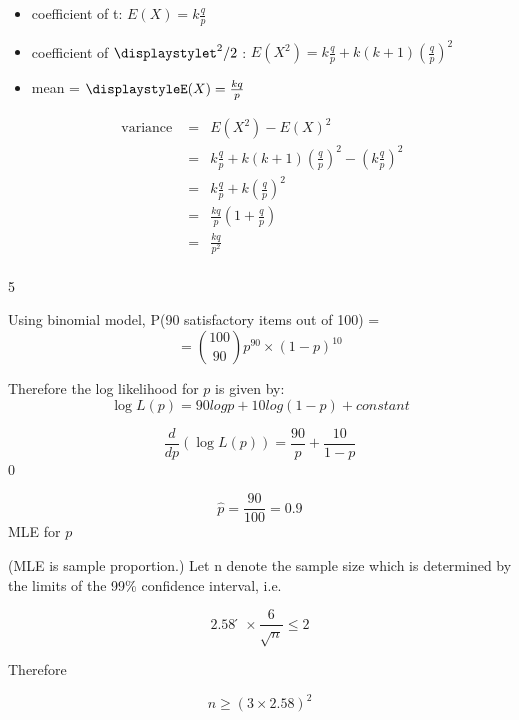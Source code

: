 \documentclass[a4paper,12pt]{article}
\begin{document}
\begin{enumerate}
\begin{itemize}
\begin{framed}
\end{framed}

\begin{itemize}
\item coefficient of t: ${ \displaystyle E ( X ) = k\frac{q}{p} }$
\item coefficient of ${ \displaystylet^2/2  }$
: ${ \displaystyle E (X^2 ) = k \frac{q}{p}+ k ( k + 1)(\frac{q}{p} )^2 }$
\item mean = ${ \displaystyleE ( X ) = \frac{kq}{p}}$
\end{itemize}

\begin{eqnarray*}
\mbox{ variance }&=& E ( X^2 ) - E( X )^2 \\ 
&=& k\frac{q}{p} + k ( k + 1)(\frac{q}{p} )^2 - \left( k\frac{q}{p} \right)^2\\
&=& k\frac{q}{p} + k \left( \frac{q}{p} \right)^2 \\
&=& \frac{kq}{p} \left( 1 + \frac{q}{p} \right) \\
&=& \frac{kq}{p^2} \\
\end{eqnarray*}


5 

Using binomial model, P(90 satisfactory items out of 100) = 
\[ = {100 \choose 90} p^90 \times (1-p)^{10}\]

Therefore the log likelihood for $p$ is given by:
\[ \log L ( p ) = 90 log p + 10 log(1 - p ) + constant\]


\[ \frac{d}{dp} \left(\log L ( p ) \right) = \frac{90}{p} + \frac{ 10 }{1 - p }\]0

\[ \hat{p}= \frac{90}{100} = 0.9\]  MLE for $p$


(MLE is sample proportion.)
Let n denote the sample size which is determined by the limits of the 99\% confidence
interval, i.e.

\[2.58  ́\times \frac{6}{\sqrt{n}} \leq 2\]


Therefore

\[ n \geq ( 3 \times 2.58)^2\]


\end{itemize}
\end{enumerate}
\end{document}
